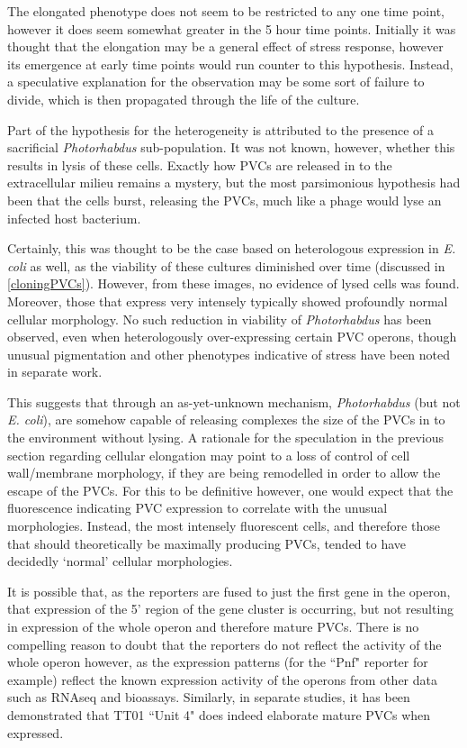 The elongated phenotype does not seem to be restricted to any one time point, however it does seem somewhat greater in the 5 hour time points. Initially it was thought that the elongation may be a general effect of stress response, however its emergence at early time points would run counter to this hypothesis. Instead, a speculative explanation for the observation may be some sort of failure to divide, which is then propagated through the life of the culture.

\clearpage
{}
Part of the hypothesis for the heterogeneity is attributed to the presence of a sacrificial \emph{Photorhabdus} sub-population. It was not known, however, whether this results in lysis of these cells. Exactly how PVCs are released in to the extracellular milieu remains a mystery, but the most parsimonious hypothesis had been that the cells burst, releasing the PVCs, much like a phage would lyse an infected host bacterium.

Certainly, this was thought to be the case based on heterologous expression in \emph{E. coli} as well, as the viability of these cultures diminished over time (discussed in \vref{cloningPVCs}). However, from these images, no evidence of lysed cells was found. Moreover, those that express very intensely typically showed profoundly normal cellular morphology. No such reduction in viability of \emph{Photorhabdus} has been observed, even when heterologously over-expressing certain PVC operons, though unusual pigmentation and other phenotypes indicative of stress have been noted in separate work.

This suggests that through an as-yet-unknown mechanism, \emph{Photorhabdus} (but not \emph{E. coli}), are somehow capable of releasing complexes the size of the PVCs in to the environment without lysing. A rationale for the speculation in the previous section regarding cellular elongation may point to a loss of control of cell wall/membrane morphology, if they are being remodelled in order to allow the escape of the PVCs. For this to be definitive however, one would expect that the fluorescence indicating PVC expression to correlate with the unusual morphologies. Instead, the most intensely fluorescent cells, and therefore those that should theoretically be maximally producing PVCs, tended to have decidedly `normal' cellular morphologies.

It is possible that, as the reporters are fused to just the first gene in the operon, that expression of the 5' region of the gene cluster is occurring, but not resulting in expression of the whole operon and therefore mature PVCs. There is no compelling reason to doubt that the reporters do not reflect the activity of the whole operon however, as the expression patterns (for the \Pasy{} ``Pnf" reporter for example) reflect the known expression activity of the operons from other data such as RNAseq and bioassays. Similarly, in separate studies, it has been demonstrated that \Plum{} TT01 ``Unit 4" does indeed elaborate mature PVCs when expressed.



